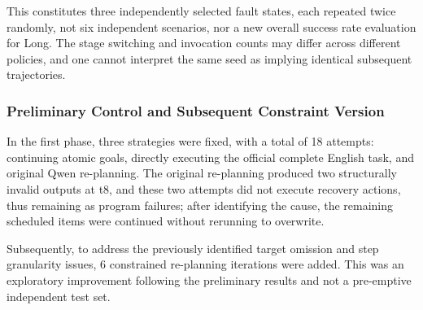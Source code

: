 This constitutes three independently selected fault states, each repeated twice randomly, not six independent scenarios, nor a new overall success rate evaluation for Long. The stage switching and invocation counts may differ across different policies, and one cannot interpret the same seed as implying identical subsequent trajectories.

\subsubsection{Preliminary Control and Subsequent Constraint Version}\label{s10-detail-5}

In the first phase, three strategies were fixed, with a total of 18 attempts: continuing atomic goals, directly executing the official complete English task, and original Qwen re-planning. The original re-planning produced two structurally invalid outputs at t8, and these two attempts did not execute recovery actions, thus remaining as program failures; after identifying the cause, the remaining scheduled items were continued without rerunning to overwrite.

Subsequently, to address the previously identified target omission and step granularity issues, 6 constrained re-planning iterations were added. This was an exploratory improvement following the preliminary results and not a pre-emptive independent test set.

